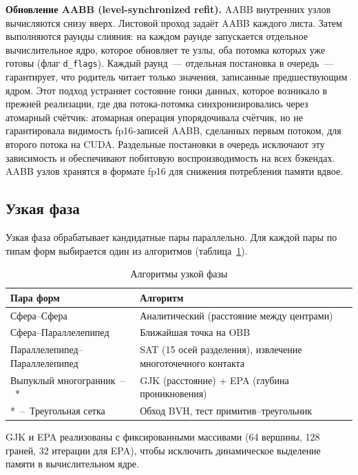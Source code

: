 \textbf{Обновление AABB (level-synchronized refit).} AABB внутренних узлов вычисляются снизу вверх. Листовой 
проход задаёт AABB каждого листа. Затем выполняются раунды слияния: на каждом раунде запускается отдельное
вычислительное ядро, которое обновляет те узлы, оба потомка которых уже готовы (флаг \texttt{d\_flags}). Каждый раунд~--- 
отдельная постановка в очередь~--- гарантирует, что родитель читает только значения, записанные предшествующим 
ядром. Этот подход устраняет состояние гонки данных, которое возникало в прежней реализации, где два 
потока-потомка синхронизировались через атомарный счётчик: атомарная операция упорядочивала счётчик, но не 
гарантировала видимость fp16-записей AABB, сделанных первым потоком, для второго потока на CUDA. Раздельные 
постановки в очередь исключают эту зависимость и обеспечивают побитовую воспроизводимость на всех бэкендах. 
AABB узлов хранятся в формате fp16 для снижения потребления памяти вдвое.

\subsection{Узкая фаза}

Узкая фаза обрабатывает кандидатные пары параллельно.
Для каждой пары по типам форм выбирается один из алгоритмов (таблица~\ref{tab:narrowphase}).

\begin{table}[h]
\centering
\caption{Алгоритмы узкой фазы}
\label{tab:narrowphase}
\begin{tabular}{lp{7.5cm}}
\toprule
\textbf{Пара форм} & \textbf{Алгоритм} \\
\midrule
Сфера--Сфера              & Аналитический (расстояние между центрами) \\
Сфера--Параллелепипед     & Ближайшая точка на OBB \\
Параллелепипед--Параллелепипед & SAT (15 осей разделения), извлечение многоточечного контакта \\
Выпуклый многогранник~--~* & GJK (расстояние) + EPA (глубина проникновения) \\
*~--~Треугольная сетка    & Обход BVH, тест примитив--треугольник \\
\bottomrule
\end{tabular}
\end{table}

GJK и EPA реализованы с фиксированными массивами (64 вершины, 128 граней, 32 итерации для EPA), чтобы 
исключить динамическое выделение памяти в вычислительном ядре.

